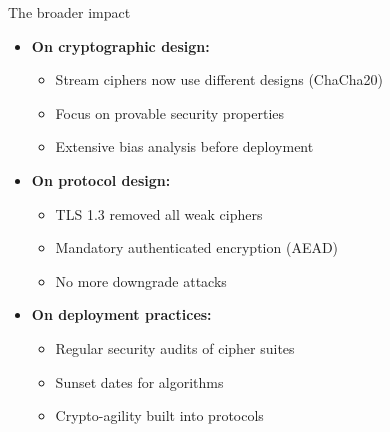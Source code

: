\documentclass[aspectratio=169, lualatex, handout]{beamer}
\begin{document}
\begin{frame}{The broader impact}
	\begin{itemize}
		\item \textbf{On cryptographic design:}
		      \begin{itemize}
			      \item Stream ciphers now use different designs (ChaCha20)
			      \item Focus on provable security properties
			      \item Extensive bias analysis before deployment
		      \end{itemize}
		\item \textbf{On protocol design:}
		      \begin{itemize}
			      \item TLS 1.3 removed all weak ciphers
			      \item Mandatory authenticated encryption (AEAD)
			      \item No more downgrade attacks
		      \end{itemize}
		\item \textbf{On deployment practices:}
		      \begin{itemize}
			      \item Regular security audits of cipher suites
			      \item Sunset dates for algorithms
			      \item Crypto-agility built into protocols
		      \end{itemize}
	\end{itemize}
\end{frame}
\end{document}
